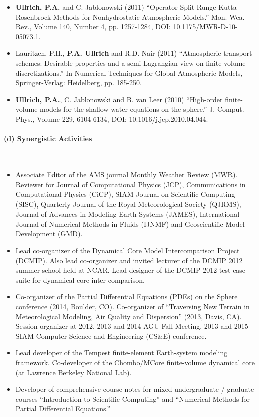\documentclass[11pt]{article}
\begin{document}
\begin{itemize}
\item \textbf{Ullrich, P.A.} and C. Jablonowski (2011) {``Operator-Split Runge-Kutta-Rosenbrock Methods for Nonhydrostatic Atmospheric Models.''} Mon. Wea. Rev., Volume 140, Number 4, pp. 1257-1284, DOI: 10.1175/MWR-D-10-05073.1. 

\item Lauritzen, P.H., \textbf{P.A. Ullrich} and R.D. Nair (2011) ``Atmospheric transport schemes: Desirable properties and a semi-Lagrangian view on finite-volume discretizations.'' In Numerical Techniques for Global Atmospheric Models, Springer-Verlag: Heidelberg, pp. 185-250.

\item \textbf{Ullrich, P.A.}, C. Jablonowski and B. van Leer (2010) {``High-order finite-volume models for the shallow-water equations on the sphere.''}  J. Comput. Phys., Volume 229, 6104-6134, DOI: 10.1016/j.jcp.2010.04.044.
\end{itemize}

\vspace{-0.3cm}
\paragraph{\large (d) Synergistic Activities}\ \\
\vspace{-0.3cm}
\begin{itemize}
\item Associate Editor of the AMS journal Monthly Weather Review (MWR).  Reviewer for Journal of Computational Physics (JCP), Communications in Computational Physics (CiCP), SIAM Journal on Scientific Computing (SISC), Quarterly Journal of the Royal Meteorological Society (QJRMS), Journal of Advances in Modeling Earth Systems (JAMES), International Journal of Numerical Methods in Fluids (IJNMF) and Geoscientific Model Development (GMD).
\item Lead co-organizer of the Dynamical Core Model Intercomparison Project (DCMIP).  Also lead co-organizer and invited lecturer of the DCMIP 2012 summer school held at NCAR.  Lead designer of the DCMIP 2012 test case suite for dynamical core inter comparison.
\item Co-organizer of the Partial Differential Equations (PDEs) on the Sphere conference (2014, Boulder, CO).  Co-organizer of  ``Traversing New Terrain in Meteorological Modeling, Air Quality and Dispersion'' (2013, Davis, CA). Session organizer at 2012, 2013 and 2014 AGU Fall Meeting, 2013 and 2015 SIAM Computer Science and Engineering (CS\&E) conference.
\item Lead developer of the Tempest finite-element Earth-system modeling framework.  Co-developer of the Chombo/MCore finite-volume dynamical core (at Lawrence Berkeley National Lab).
\item Developer of comprehensive course notes for mixed undergraduate / graduate courses ``Introduction to Scientific Computing'' and ``Numerical Methods for Partial Differential Equations.''
\end{itemize}
\end{document}
